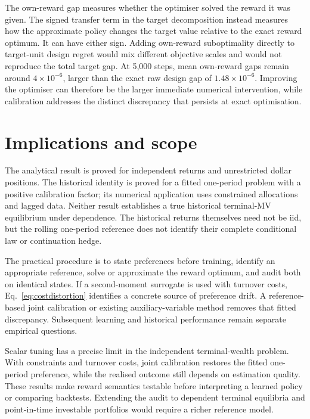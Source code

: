 \documentclass[sigconf,anonymous,review]{acmart}
\begin{document}
The own-reward gap measures whether the optimiser solved the reward it was given. The signed transfer term in the target decomposition instead measures how the approximate policy changes the target value relative to the exact reward optimum. It can have either sign. Adding own-reward suboptimality directly to target-unit design regret would mix different objective scales and would not reproduce the total target gap. At 5,000 steps, mean own-reward gaps remain around $4\times10^{-6}$, larger than the exact raw design gap of $1.48\times10^{-6}$. Improving the optimiser can therefore be the larger immediate numerical intervention, while calibration addresses the distinct discrepancy that persists at exact optimisation.

\section{Implications and scope}
The analytical result is proved for independent returns and unrestricted dollar positions. The historical identity is proved for a fitted one-period problem with a positive calibration factor; its numerical application uses constrained allocations and lagged data. Neither result establishes a true historical terminal-MV equilibrium under dependence. The historical returns themselves need not be iid, but the rolling one-period reference does not identify their complete conditional law or continuation hedge.

The practical procedure is to state preferences before training, identify an appropriate reference, solve or approximate the reward optimum, and audit both on identical states. If a second-moment surrogate is used with turnover costs, Eq.\ \eqref{eq:costdistortion} identifies a concrete source of preference drift. A reference-based joint calibration or existing auxiliary-variable method removes that fitted discrepancy. Subsequent learning and historical performance remain separate empirical questions.

Scalar tuning has a precise limit in the independent terminal-wealth problem. With constraints and turnover costs, joint calibration restores the fitted one-period preference, while the realised outcome still depends on estimation quality. These results make reward semantics testable before interpreting a learned policy or comparing backtests. Extending the audit to dependent terminal equilibria and point-in-time investable portfolios would require a richer reference model.
\end{document}
